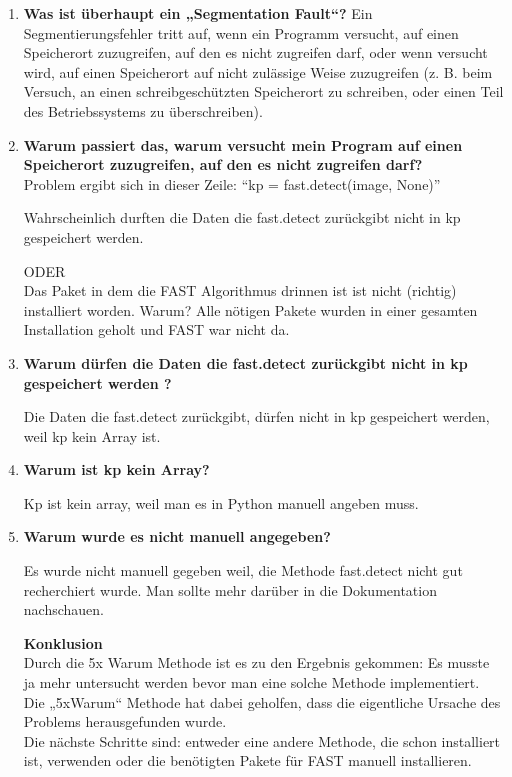 \begin{enumerate}
	
	
		\item  \textbf{Was ist überhaupt ein „Segmentation Fault“? }
	Ein Segmentierungsfehler tritt auf, wenn ein Programm versucht, auf einen
	Speicherort zuzugreifen, auf den es nicht zugreifen darf, oder wenn versucht
	wird, auf einen Speicherort auf nicht zulässige Weise zuzugreifen (z. B. beim
	Versuch, an einen schreibgeschützten Speicherort zu schreiben, oder einen Teil
	des Betriebssystems zu überschreiben).
	\item \textbf{Warum passiert das, warum versucht mein Program auf einen Speicherort
	zuzugreifen, auf den es nicht zugreifen darf?}\\
	Problem ergibt sich in dieser Zeile: 
	“kp = fast.detect(image, None)”
	
	Wahrscheinlich durften die Daten die fast.detect zurückgibt nicht in kp gespeichert
	werden. 
	
	ODER\\
	
	Das Paket in dem die FAST Algorithmus drinnen ist ist nicht (richtig)
	installiert worden.
	Warum? Alle nötigen Pakete wurden in einer gesamten Installation geholt und
	FAST war nicht da. 
	
	\item	\textbf{Warum dürfen die Daten die fast.detect zurückgibt nicht in kp gespeichert
	werden ? }
	
	Die Daten die fast.detect zurückgibt, dürfen nicht in kp gespeichert werden, weil
	kp kein Array ist. 
	
	\item	\textbf{Warum ist kp kein Array? }
	
	Kp ist kein array, weil man es in Python  manuell angeben muss.
	
	\item \textbf{Warum wurde es nicht manuell angegeben? }
	
	Es wurde nicht manuell gegeben weil, die Methode fast.detect nicht gut
	recherchiert wurde. Man sollte mehr darüber in die Dokumentation nachschauen.
	
	\textbf{Konklusion}\\
	Durch die 5x Warum Methode ist es zu den Ergebnis gekommen: Es musste ja mehr
	untersucht werden bevor man eine solche Methode implementiert. Die „5xWarum“
	Methode hat dabei geholfen, dass die eigentliche Ursache des Problems
	herausgefunden wurde.\\
	Die nächste Schritte sind: entweder eine andere Methode, die schon installiert
	ist, verwenden oder die benötigten Pakete für FAST manuell installieren. 
	
	
	
\end{enumerate}


